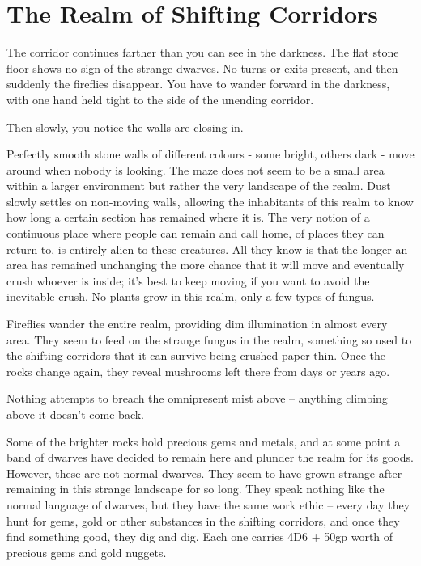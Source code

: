 \section{The Realm of Shifting Corridors}\label{shiftingcorridors}

\begin{multicols}{2}

\begin{boxtext}
	The corridor continues farther than you can see in the darkness.  The flat stone floor shows no sign of the strange dwarves.  No turns or exits present, and then suddenly the fireflies disappear.  You have to wander forward in the darkness, with one hand held tight to the side of the unending corridor.

	Then slowly, you notice the walls are closing in.

\end{boxtext}

Perfectly smooth stone walls of different colours - some bright, others dark - move around when nobody is looking.  The maze does not seem to be a small area within a larger environment but rather the very landscape of the realm.  Dust slowly settles on non-moving walls, allowing the inhabitants of this realm to know how long a certain section has remained where it is.  The very notion of a continuous place where people can remain and call home, of places they can return to, is entirely alien to these creatures.  All they know is that the longer an area has remained unchanging the more chance that it will move and eventually crush whoever is inside; it's best to keep moving if you want to avoid the inevitable crush.  No plants grow in this realm, only a few types of fungus.

Fireflies wander the entire realm, providing dim illumination in almost every area.  They seem to feed on the strange fungus in the realm, something so used to the shifting corridors that it can survive being crushed paper-thin.  Once the rocks change again, they reveal mushrooms left there from days or years ago.

Nothing attempts to breach the omnipresent mist above -- anything climbing above it doesn't come back.

Some of the brighter rocks hold precious gems and metals, and at some point a band of dwarves have decided to remain here and plunder the realm for its goods.  However, these are not normal dwarves.  They seem to have grown strange after remaining in this strange landscape for so long.  They speak nothing like the normal language of dwarves, but they have the same work ethic -- every day they hunt for gems, gold or other substances in the shifting corridors, and once they find something good, they dig and dig.  Each one carries 4D6 + 50gp worth of precious gems and gold nuggets.


\end{multicols}
